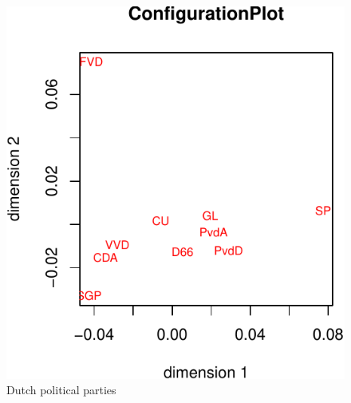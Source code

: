 \documentclass[
  12pt,
]{article}
\begin{document}
\begin{figure}

{\centering \includegraphics{smacofPC_files/figure-latex/partiesconf-1} 

}

\caption{Dutch political parties}\label{fig:partiesconf}
\end{figure}
\end{document}
